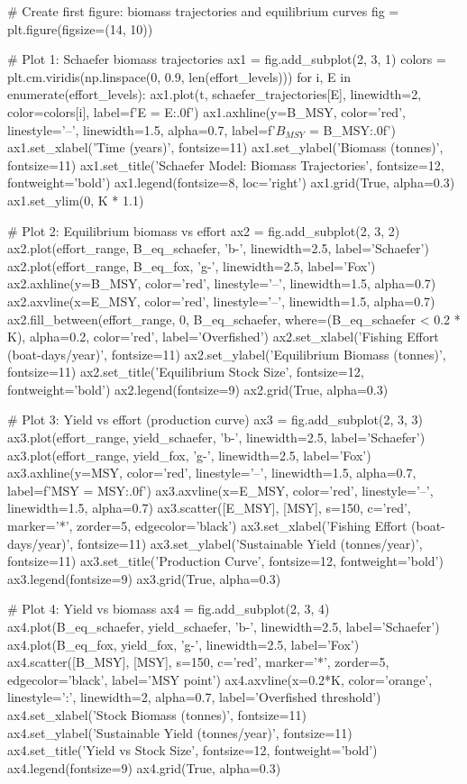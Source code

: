 \documentclass[a4paper, 11pt]{article}
\begin{document}
\begin{pycode}
# Create first figure: biomass trajectories and equilibrium curves
fig = plt.figure(figsize=(14, 10))

# Plot 1: Schaefer biomass trajectories
ax1 = fig.add_subplot(2, 3, 1)
colors = plt.cm.viridis(np.linspace(0, 0.9, len(effort_levels)))
for i, E in enumerate(effort_levels):
    ax1.plot(t, schaefer_trajectories[E], linewidth=2, color=colors[i],
             label=f'E = {E:.0f}')
ax1.axhline(y=B_MSY, color='red', linestyle='--', linewidth=1.5, alpha=0.7,
            label=f'$B_{{MSY}}$ = {B_MSY:.0f}')
ax1.set_xlabel('Time (years)', fontsize=11)
ax1.set_ylabel('Biomass (tonnes)', fontsize=11)
ax1.set_title('Schaefer Model: Biomass Trajectories', fontsize=12, fontweight='bold')
ax1.legend(fontsize=8, loc='right')
ax1.grid(True, alpha=0.3)
ax1.set_ylim(0, K * 1.1)

# Plot 2: Equilibrium biomass vs effort
ax2 = fig.add_subplot(2, 3, 2)
ax2.plot(effort_range, B_eq_schaefer, 'b-', linewidth=2.5, label='Schaefer')
ax2.plot(effort_range, B_eq_fox, 'g-', linewidth=2.5, label='Fox')
ax2.axhline(y=B_MSY, color='red', linestyle='--', linewidth=1.5, alpha=0.7)
ax2.axvline(x=E_MSY, color='red', linestyle='--', linewidth=1.5, alpha=0.7)
ax2.fill_between(effort_range, 0, B_eq_schaefer, where=(B_eq_schaefer < 0.2 * K),
                  alpha=0.2, color='red', label='Overfished')
ax2.set_xlabel('Fishing Effort (boat-days/year)', fontsize=11)
ax2.set_ylabel('Equilibrium Biomass (tonnes)', fontsize=11)
ax2.set_title('Equilibrium Stock Size', fontsize=12, fontweight='bold')
ax2.legend(fontsize=9)
ax2.grid(True, alpha=0.3)

# Plot 3: Yield vs effort (production curve)
ax3 = fig.add_subplot(2, 3, 3)
ax3.plot(effort_range, yield_schaefer, 'b-', linewidth=2.5, label='Schaefer')
ax3.plot(effort_range, yield_fox, 'g-', linewidth=2.5, label='Fox')
ax3.axhline(y=MSY, color='red', linestyle='--', linewidth=1.5, alpha=0.7,
            label=f'MSY = {MSY:.0f}')
ax3.axvline(x=E_MSY, color='red', linestyle='--', linewidth=1.5, alpha=0.7)
ax3.scatter([E_MSY], [MSY], s=150, c='red', marker='*', zorder=5, edgecolor='black')
ax3.set_xlabel('Fishing Effort (boat-days/year)', fontsize=11)
ax3.set_ylabel('Sustainable Yield (tonnes/year)', fontsize=11)
ax3.set_title('Production Curve', fontsize=12, fontweight='bold')
ax3.legend(fontsize=9)
ax3.grid(True, alpha=0.3)

# Plot 4: Yield vs biomass
ax4 = fig.add_subplot(2, 3, 4)
ax4.plot(B_eq_schaefer, yield_schaefer, 'b-', linewidth=2.5, label='Schaefer')
ax4.plot(B_eq_fox, yield_fox, 'g-', linewidth=2.5, label='Fox')
ax4.scatter([B_MSY], [MSY], s=150, c='red', marker='*', zorder=5, edgecolor='black',
            label='MSY point')
ax4.axvline(x=0.2*K, color='orange', linestyle=':', linewidth=2, alpha=0.7,
            label='Overfished threshold')
ax4.set_xlabel('Stock Biomass (tonnes)', fontsize=11)
ax4.set_ylabel('Sustainable Yield (tonnes/year)', fontsize=11)
ax4.set_title('Yield vs Stock Size', fontsize=12, fontweight='bold')
ax4.legend(fontsize=9)
ax4.grid(True, alpha=0.3)


\end{pycode}
\end{document}
